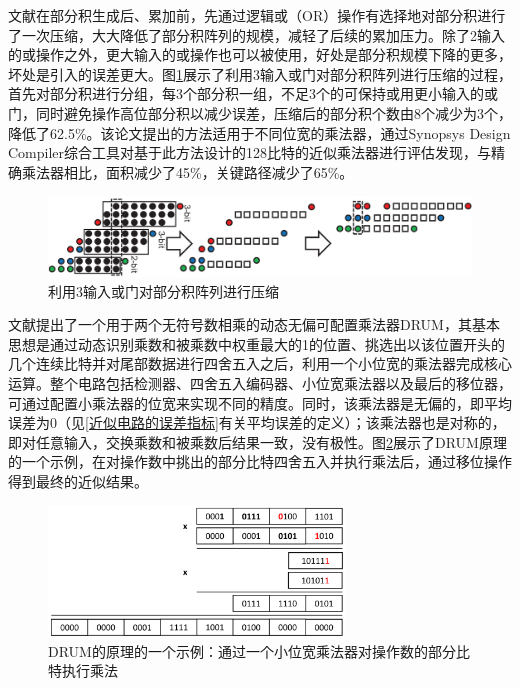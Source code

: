 文献\cite{AC:AM:SDLC}在部分积生成后、累加前，先通过逻辑或（OR）操作有选择地对部分积进行了一次压缩，大大降低了部分积阵列的规模，减轻了后续的累加压力。除了2输入的或操作之外，更大输入的或操作也可以被使用，好处是部分积规模下降的更多，坏处是引入的误差更大。图\ref{AC:AM:Fig:SDLC_OR3}展示了利用3输入或门对部分积阵列进行压缩的过程，首先对部分积进行分组，每3个部分积一组，不足3个的可保持或用更小输入的或门，同时避免操作高位部分积以减少误差，压缩后的部分积个数由8个减少为3个，降低了62.5\%。该论文提出的方法适用于不同位宽的乘法器，通过Synopsys Design Compiler综合工具对基于此方法设计的128比特的近似乘法器进行评估发现，与精确乘法器相比，面积减少了45\%，关键路径减少了65\%。
\begin{figure}[!htb]
    \centering
    \includegraphics[width=\textwidth]{figs/AC-AM-SDLC_OR3.png}
    \caption{利用3输入或门对部分积阵列进行压缩}
\label{AC:AM:Fig:SDLC_OR3}
\end{figure}

文献\cite{AC:AM:DRUM}提出了一个用于两个无符号数相乘的动态无偏可配置乘法器DRUM，其基本思想是通过动态识别乘数和被乘数中权重最大的1的位置、挑选出以该位置开头的几个连续比特并对尾部数据进行四舍五入之后，利用一个小位宽的乘法器完成核心运算。整个电路包括检测器、四舍五入编码器、小位宽乘法器以及最后的移位器，可通过配置小乘法器的位宽来实现不同的精度。同时，该乘法器是无偏的，即平均误差为0（见\ref{近似电路的误差指标}有关平均误差的定义）；该乘法器也是对称的，即对任意输入，交换乘数和被乘数后结果一致，没有极性。图\ref{AC:AM:Fig:DRUM_example}展示了DRUM原理的一个示例，在对操作数中挑出的部分比特四舍五入并执行乘法后，通过移位操作得到最终的近似结果。
\begin{figure}[!htb]
    \centering
    \includegraphics[width=0.7\textwidth]{figs/AC-AM-DRUM_example.png}
    \caption{DRUM的原理的一个示例：通过一个小位宽乘法器对操作数的部分比特执行乘法}
\label{AC:AM:Fig:DRUM_example}
\end{figure}

